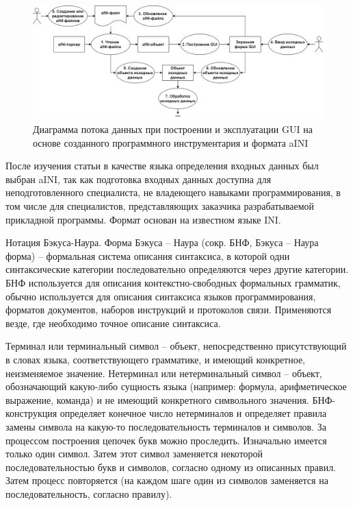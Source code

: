 \begin{figure}[!ht]
  \centering
  \includegraphics[scale=0.8]{ResearchNotes/rndhpc_int_gui_2022_09_29/diagram.png}
  \caption{Диаграмма потока данных при построении и эксплуатации GUI на основе созданного программного инструментария и формата aINI}
  \label{rndhpcgui.2022.09.29.diagram}
\end{figure}

После изучения статьи в качестве языка определения входных данных был выбран aINI, так как подготовка входных данных доступна для неподготовленного специалиста, не владеющего навыками программирования, в том числе для специалистов, представляющих заказчика разрабатываемой прикладной программы. Формат основан на известном языке INI.

Нотация Бэкуса-Наура. Форма Бэкуса -- Наура (сокр. БНФ, Бэкуса -- Наура форма) -- формальная система описания синтаксиса, в которой одни синтаксические категории последовательно определяются через другие категории. БНФ используется для описания контекстно-свободных формальных грамматик, обычно используется для описания синтаксиса языков программирования, форматов документов, наборов инструкций и протоколов связи. Применяются везде, где необходимо точное описание синтаксиса.

Терминал или терминальный символ -- объект, непосредственно присутствующий в словах языка, соответствующего грамматике, и имеющий конкретное, неизменяемое значение. Нетерминал или нетерминальный символ -- объект, обозначающий какую-либо сущность языка (например: формула, арифметическое выражение, команда) и не имеющий конкретного символьного значения. БНФ-конструкция определяет конечное число нетерминалов и определяет правила замены символа на какую-то последовательность терминалов и символов. За процессом построения цепочек букв можно проследить. Изначально имеется только один символ. Затем этот символ заменяется некоторой последовательностью букв и символов, согласно одному из описанных правил. Затем процесс повторяется (на каждом шаге один из символов заменяется на последовательность, согласно правилу).
\noteattributes{}


